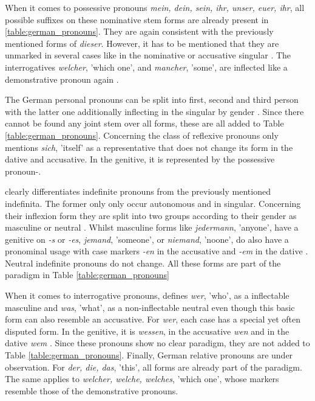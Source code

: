 \documentclass[11pt,a4paper,twoside,openright]{scrbook}
\begin{document}
When it comes to possessive pronouns \textit{mein, dein, sein, ihr, unser, euer, ihr}, all possible suffixes on these nominative stem forms are already present in \ref{table:german_pronouns}. They are again consistent with the previously mentioned forms of \textit{dieser}. However, it has to be mentioned that they are unmarked in several cases like in the nominative or accusative singular \citep{thieroff2012ger}. The interrogatives \textit{welcher}, 'which one', and \textit{mancher}, 'some', are inflected like a demonstrative pronoun again \citep{thieroff2012ger}. 

The German personal pronouns can be split into first, second and third person with the latter one additionally inflecting in the singular by gender \citep{thieroff2012ger}. Since there cannot be found any joint stem over all forms, these are all added to Table \ref{table:german_pronouns}. Concerning the class of reflexive pronouns \citet{thieroff2012ger} only mentions \textit{sich}, 'itself' as a representative that does not change its form in the dative and accusative. In the genitive, it is represented by the possessive pronoun-.

\citet{thieroff2012ger} clearly differentiates indefinite pronouns from the previously mentioned indefinita. The former only only occur autonomous and in singular. Concerning their inflexion form they are split into two groups according to their gender as masculine or neutral \citep{thieroff2012ger}. Whilst masculine forms like \textit{jedermann}, 'anyone', have a  genitive on \textit{-s} or \textit{-es}, \textit{jemand}, 'someone', or \textit{niemand}, 'noone', do also have a pronominal usage with case markers \textit{-en} in the accusative and \textit{-em} in the dative \citep{thieroff2012ger}. Neutral indefinite pronouns do not change. All these forms are part of the paradigm in Table \ref{table:german_pronouns}

When it comes to interrogative pronouns, \citet{thieroff2012ger} defines \textit{wer}, 'who', as a inflectable masculine and \textit{was}, 'what', as a non-inflectable neutral even though this basic form can also resemble an accusative. For \textit{wer}, each case has a special yet often disputed form. In the genitive, it is \textit{wessen}, in the accusative \textit{wen} and  in the dative \textit{wem} \citep{thieroff2012ger}. Since these pronouns show no clear paradigm, they are not added to Table \ref{table:german_pronouns}. Finally, German relative pronouns are under observation. For \textit{der, die, das}, 'this', all forms are already part of the paradigm. The same applies to \textit{welcher, welche, welches}, 'which one', whose markers resemble those of the demonstrative pronouns.
\end{document}
